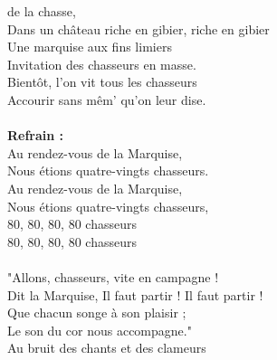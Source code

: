 
 de la chasse,
\\Dans un château riche en gibier, riche en gibier
\\Une marquise aux fins limiers
\\Invitation des chasseurs en masse.
\\Bientôt, l'on vit tous les chasseurs
\\Accourir sans mêm' qu'on leur dise.
\\\\\textbf{Refrain :}
\\Au rendez-vous de la Marquise,
\\Nous étions quatre-vingts chasseurs.
\\Au rendez-vous de la Marquise,
\\Nous étions quatre-vingts chasseurs,
\\80, 80, 80, 80 chasseurs
\\80, 80, 80, 80 chasseurs
\\\\"Allons, chasseurs, vite en campagne !
\\Dit la Marquise, Il faut partir ! Il faut partir !
\\Que chacun songe à son plaisir ;
\\Le son du cor nous accompagne."
\\Au bruit des chants et des clameurs
